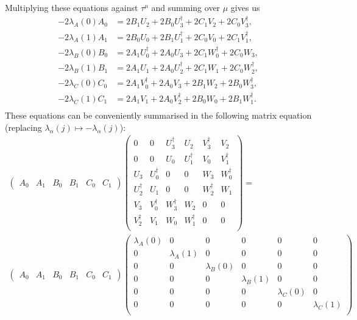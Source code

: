 \documentclass[12pt]{amsart}
\theoremstyle{definition}
\theoremstyle{remark}
\numberwithin{equation}{section}
\begin{document}
Multiplying these equations against $\tau^\mu$ and summing over $\mu$ gives us
\begin{equation}
	\begin{split}
		-2\lambda_A(0) A_0 &= 2B_1 U_2 + 2B_0 U_3^\dag + 2C_1 V_2 + 2C_0V_3^\dag, \\
		-2\lambda_A(1) A_1 &= 2B_0 U_0 + 2B_1 U_1^\dag + 2C_0 V_0 + 2C_1V_1^\dag, \\
		-2\lambda_B(0) B_0 &= 2A_1 U_0^\dag + 2A_0 U_3 + 2C_1 W_0^\dag + 2C_0W_3, \\
		-2\lambda_B(1) B_1 &= 2A_1 U_1 + 2A_0 U_2^\dag + 2C_1 W_1 + 2C_0W_2^\dag, \\
		-2\lambda_C(0) C_0 &= 2A_1 V_0^\dag + 2A_0 V_3 + 2B_1 W_2 + 2B_0W_3^\dag, \\
		-2\lambda_C(1) C_1 &= 2A_1 V_1 + 2A_0 V_2^\dag + 2B_0 W_0 + 2B_1W_1^\dag. \\ 
	\end{split}
\end{equation}
These equations can be conveniently summarised in the following matrix equation (replacing $\lambda_\alpha(j) \mapsto -\lambda_\alpha(j)$):
\begin{multline}
	\begin{pmatrix}
		A_0 & A_1 & B_0 & B_1 & C_0 & C_1
	\end{pmatrix}
	\begin{pmatrix}
		0 & 0 & U_3^\dag & U_2 & V_3^\dag & V_2 \\
		0 & 0 & U_0 & U_1^\dag & V_0 & V_1^\dag \\
		U_3  & U_0^\dag & 0 & 0 & W_3 & W_0^\dag \\
		U_2^\dag & U_1 & 0 & 0 & W_2^\dag & W_1  \\
		V_3 & V_0^\dag & W_3^\dag & W_2 & 0 & 0 \\
		V_2^\dag & V_1 & W_0 & W_1^\dag & 0 & 0 \\
	\end{pmatrix}
	= \\ \begin{pmatrix}
		A_0 & A_1 & B_0 & B_1 & C_0 & C_1
	\end{pmatrix}
	\begin{pmatrix}
		\lambda_A(0) & 0 & 0 & 0 & 0 & 0 \\
		0 & \lambda_A(1) & 0 & 0 & 0 & 0 \\
		0 & 0 & \lambda_B(0) & 0 & 0 & 0 \\
		0 & 0 & 0 & \lambda_B(1) & 0 & 0 \\
		0 & 0 & 0 & 0 & \lambda_C(0) & 0 \\
		0 & 0 & 0 & 0 & 0 & \lambda_C(1) \\
	\end{pmatrix}
\end{multline}
\end{document}
